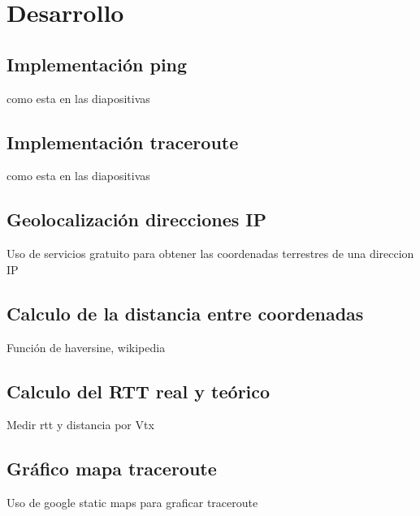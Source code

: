 \section{Desarrollo}

\subsection{Implementación ping}

como esta en las diapositivas

\subsection{Implementación traceroute}

como esta en las diapositivas

\subsection{Geolocalización direcciones IP}

Uso de servicios gratuito para obtener las coordenadas terrestres de una direccion IP

\subsection{Calculo de la distancia entre coordenadas}

Función de haversine, wikipedia

\subsection{Calculo del RTT real y teórico}

Medir rtt y distancia por Vtx

\subsection{Gráfico mapa traceroute}

Uso de google static maps para graficar traceroute
